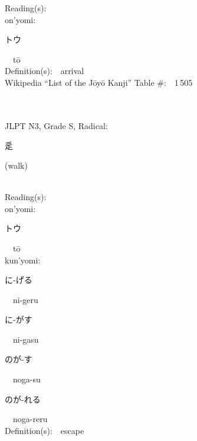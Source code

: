 \begin{multicols}{2}
Reading(s):\ \ \\
{\hspace*{1em}}on'yomi:\ \ \\
{\hspace*{2em}}{\begin{CJK}{UTF8}{min} トウ \end{CJK}}\ \ t\=o\ \ \\
Definition(s):\ \ arrival \\
Wikipedia ``List of the J\=oy\=o Kanji'' Table \#:\ \ 1\,505 \\
\ \ \\
{\fontsize{34pt}{40pt}  }\ \ \\  %
{JLPT N3, Grade S, Radical:\ \ {\begin{CJK}{UTF8}{min} 辵 \end{CJK}} (walk) } \\
Reading(s):\ \ \\
{\hspace*{1em}}on'yomi:\ \ \\
{\hspace*{2em}}{\begin{CJK}{UTF8}{min} トウ \end{CJK}}\ \ t\=o\ \ \\
{\hspace*{1em}}kun'yomi:\ \ \\
{\hspace*{2em}}{\begin{CJK}{UTF8}{min} に-げる \end{CJK}}\ \ ni-geru\ \ \\
{\hspace*{2em}}{\begin{CJK}{UTF8}{min} に-がす \end{CJK}}\ \ ni-gasu\ \ \\
{\hspace*{2em}}{\begin{CJK}{UTF8}{min} のが-す \end{CJK}}\ \ noga-su\ \ \\
{\hspace*{2em}}{\begin{CJK}{UTF8}{min} のが-れる \end{CJK}}\ \ noga-reru\ \ \\
Definition(s):\ \ escape \\

\end{multicols}
